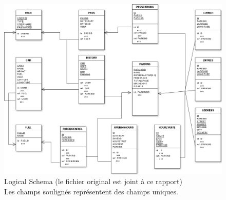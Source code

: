 \documentclass[a4paper,11pt]{article}
\begin{document}
\begin{figure}[H]
	\begin{center}
		\includegraphics[width=1\textwidth]{schema_logic_new-M4.png}
		\caption{Logical Schema (le fichier original est joint à ce rapport)\\Les champs soulignés représentent des champs uniques.}
		\label{fig:logic}
	\end{center}
\end{figure}
\end{document}
